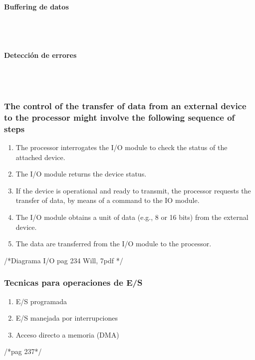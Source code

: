 \paragraph{Buffering de datos}\mbox{}\\\\%
\paragraph{Detección de errores}\mbox{}\\\\%

\subsubsection{The control of the transfer of data from an external device to the processor might involve the following sequence of steps}
\begin{enumerate}
\item The processor interrogates the I/O module to check the status of the attached device.
\item The I/O module returns the device status.
\item If the device is operational and ready to transmit, the processor requests the transfer of data, by means of a command to the IO module.
\item  The I/O module obtains a unit of data (e.g., 8 or 16 bits) from the external device.
\item The data are transferred from the I/O module to the processor.
\end{enumerate}

/*Diagrama I/O pag 234 Will, 7pdf */

\subsubsection{Tecnicas para operaciones de E/S}
\begin{enumerate}
\item  E/S programada
\item  E/S manejada por interrupciones
\item  Acceso directo a memoria (DMA)
\end{enumerate}

/*pag 237*/

